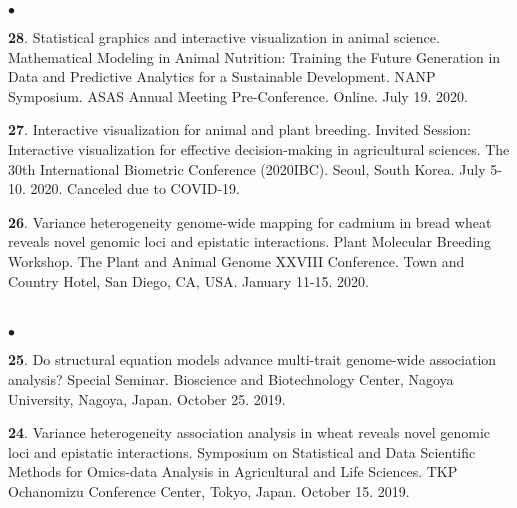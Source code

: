 \documentclass[margin,line,10pt]{res}
\newenvironment{list2}{
  \begin{list}{$\bullet$}{%
      \setlength{\itemsep}{0in}
      \setlength{\parsep}{0in} \setlength{\parskip}{0in}
      \setlength{\topsep}{0in} \setlength{\partopsep}{0in} 
      \setlength{\leftmargin}{0.2in}}}{\end{list}}
\begin{document}
\begin{resume}
\begin{list2}
     \vspace{0.5cm}

 \item [{\bf 28}.] Statistical graphics and interactive visualization in animal science. Mathematical Modeling in Animal Nutrition: Training the Future Generation in Data and Predictive Analytics for a Sustainable Development. NANP Symposium. ASAS Annual Meeting Pre-Conference. Online. July 19. 2020.


  \vspace{0.5cm}


\item [{\bf 27}.] Interactive visualization for animal and plant breeding. Invited Session: Interactive visualization for effective decision-making in agricultural sciences. The 30th International Biometric Conference (2020IBC). Seoul, South Korea. July 5-10. 2020. Canceled due to COVID-19. 

  \vspace{0.5cm}
    
\item [{\bf 26}.] Variance heterogeneity genome-wide mapping for cadmium in bread wheat reveals novel genomic loci and epistatic interactions. Plant Molecular Breeding Workshop. The Plant and Animal Genome XXVIII Conference. Town and Country Hotel, San Diego, CA, USA. January 11-15. 2020.
  
\end{list2}



\section{}
\begin{list2}

\item [{\bf 25}.] Do structural equation models advance multi-trait genome-wide association analysis? Special Seminar. Bioscience and Biotechnology Center, Nagoya University, Nagoya, Japan. October 25. 2019.  
  
  \vspace{0.5cm}
  
   \item [{\bf 24}.] Variance heterogeneity association analysis in wheat reveals novel genomic loci and epistatic interactions. Symposium on Statistical and Data Scientific Methods for Omics-data Analysis in Agricultural and Life Sciences. TKP Ochanomizu Conference Center, Tokyo, Japan. October 15. 2019. 


\end{list2}
\end{resume}
\end{document}
